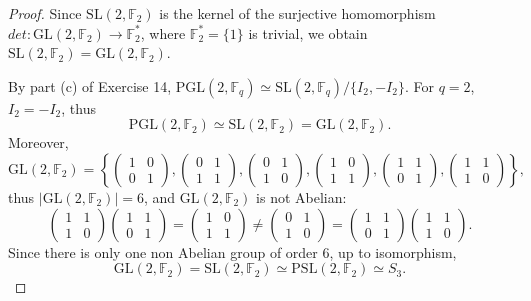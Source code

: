 \documentclass[11pt,a4paper]{article}
\newcommand{\F}{\mathbb{F}}
\begin{document}
 \begin{proof}
 Since $\mathrm{SL}(2,\F_2)$ is the kernel of the surjective homomorphism $det : \mathrm{GL}(2,\F_2) \to \F_2^*$, where $\F_2^* = \{1\}$ is trivial, we obtain $\mathrm{SL}(2,\F_2) = \mathrm{GL}(2,\F_2)$. 
 
 By part (c) of Exercise 14, $\mathrm{PGL}(2,\F_q) \simeq \mathrm{SL}(2,\F_q)/\{I_2,-I_2\}.$
   For $q = 2$, $I_2 = -I_2$, thus 
  $$\mathrm{PGL}(2,\F_2) \simeq \mathrm{SL}(2,\F_2) = \mathrm{GL}(2,\F_2).$$
  Moreover,
  $$\mathrm{GL}(2,\F_2) = \left\{
   \begin{pmatrix}
  1 & 0\\
  0 & 1
  \end{pmatrix},
  \begin{pmatrix}
  0 & 1\\
  1 & 1
  \end{pmatrix},
   \begin{pmatrix}
  0 & 1\\
  1 & 0
  \end{pmatrix},
   \begin{pmatrix}
  1 & 0\\
  1 & 1
  \end{pmatrix},
   \begin{pmatrix}
  1 & 1\\
  0 & 1
  \end{pmatrix},
    \begin{pmatrix}
  1 & 1\\
  1 & 0
  \end{pmatrix}
  \right\},
  $$
  thus $|\mathrm{GL}(2,\F_2)| = 6$, and $\mathrm{GL}(2,\F_2) $ is not Abelian:
  $$
   \begin{pmatrix}
  1 & 1\\
  1 & 0
  \end{pmatrix}
  \begin{pmatrix}
  1 & 1\\
  0 & 1
  \end{pmatrix}
  =
    \begin{pmatrix}
  1 & 0\\
  1 & 1
  \end{pmatrix}
  \ne
    \begin{pmatrix}
  0 & 1\\
  1 & 0
  \end{pmatrix}
=
 \begin{pmatrix}
  1 & 1\\
  0 & 1
  \end{pmatrix}
  \begin{pmatrix}
  1 & 1\\
  1 & 0
  \end{pmatrix}.
  $$
Since there is only one non Abelian group of order 6, up to isomorphism,
  $$\mathrm{GL}(2,\F_2) = \mathrm{SL}(2,\F_2) \simeq \mathrm{PSL}(2,\F_2) \simeq S_3.$$
  

\end{proof}
\end{document}
